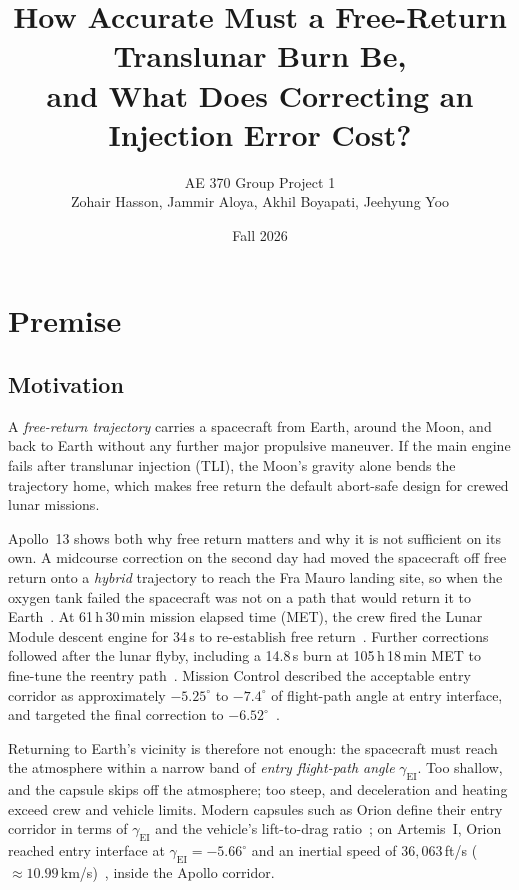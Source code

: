 \documentclass[11pt]{article}
\title{How Accurate Must a Free-Return Translunar Burn Be,\\ and What Does Correcting an Injection Error Cost?}
\author{AE 370 Group Project 1 \\ Zohair Hasson, Jammir Aloya, Akhil Boyapati, Jeehyung Yoo}
\date{Fall 2026}
\newcommand{\gEI}{\gamma_{\mathrm{EI}}}
\begin{document}
\maketitle

\section{Premise}
\label{sec:premise}

\subsection{Motivation}

A \emph{free-return trajectory} carries a spacecraft from Earth, around the Moon, and back to Earth without any further major propulsive maneuver. If the main engine fails after translunar injection (TLI), the Moon's gravity alone bends the trajectory home, which makes free return the default abort-safe design for crewed lunar missions.

Apollo~13 shows both why free return matters and why it is not sufficient on its own. A midcourse correction on the second day had moved the spacecraft off free return onto a \emph{hybrid} trajectory to reach the Fra Mauro landing site, so when the oxygen tank failed the spacecraft was not on a path that would return it to Earth~\cite{nasa_apollo13}. At 61\,h\,30\,min mission elapsed time (MET), the crew fired the Lunar Module descent engine for 34\,s to re-establish free return~\cite{nasa_apollo13}. Further corrections followed after the lunar flyby, including a 14.8\,s burn at 105\,h\,18\,min MET to fine-tune the reentry path~\cite{nasa_apollo13}. Mission Control described the acceptable entry corridor as approximately $-5.25^\circ$ to $-7.4^\circ$ of flight-path angle at entry interface, and targeted the final correction to $-6.52^\circ$~\cite{afj_day5}.

Returning to Earth's vicinity is therefore not enough: the spacecraft must reach the atmosphere within a narrow band of \emph{entry flight-path angle} $\gEI$. Too shallow, and the capsule skips off the atmosphere; too steep, and deceleration and heating exceed crew and vehicle limits. Modern capsules such as Orion define their entry corridor in terms of $\gEI$ and the vehicle's lift-to-drag ratio~\cite{rea_orion}; on Artemis~I, Orion reached entry interface at $\gEI = -5.66^\circ$ and an inertial speed of $36{,}063$\,ft/s ($\approx 10.99$\,km/s)~\cite{rea_artemis1}, inside the Apollo corridor.
\end{document}
